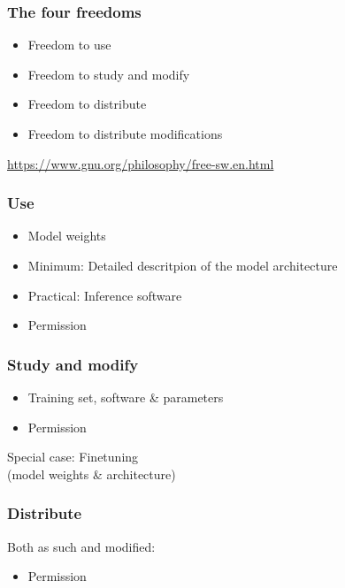 \documentclass[17pt,aspectratio=169,hyperref={pdfusetitle,colorlinks,allcolors=olive}]{beamer}
\begin{document}
\begin{frame}[fragile]
\frametitle{The four freedoms}

\begin{itemize}
\item Freedom to use
\item Freedom to study and modify
\item Freedom to distribute
\item Freedom to distribute modifications
\end{itemize}

\begin{flushright}
  \url{https://www.gnu.org/philosophy/free-sw.en.html}
\end{flushright}
\end{frame}

\begin{frame}[fragile]
\frametitle{Use}

\begin{itemize}
\item Model weights
\item Minimum: Detailed descritpion of the model architecture
\item Practical: Inference software
\item Permission
\end{itemize}
\end{frame}

\begin{frame}[fragile]
\frametitle{Study and modify}

\begin{itemize}
\item Training set, software \& parameters
\item Permission
\end{itemize}

Special case: Finetuning \\
(model weights \& architecture)

\end{frame}

\begin{frame}[fragile]
\frametitle{Distribute}

Both as such and modified:

\begin{itemize}
\item Permission
\end{itemize}
\end{frame}
\end{document}
